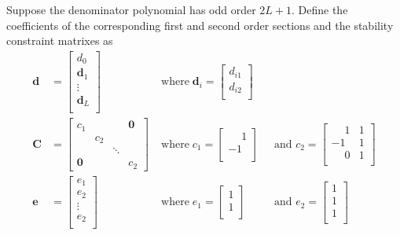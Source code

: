 \documentclass[a4paper,twoside,10pt,english]{report}
\begin{document}
Suppose the denominator polynomial has odd order $2L+1$. Define the
coefficients of the corresponding first and second order sections and the
stability constraint matrixes as
\begin{align*}
\boldsymbol{d}&=\left[\begin{array}{c}
d_{0} \\
\boldsymbol{d}_{1} \\
\vdots \\
\boldsymbol{d}_{L} \\
\end{array}\right]
\; &\text{where}\; \boldsymbol{d}_{i}=\left[\begin{array}{c}
d_{i1} \\
d_{i2} \\
\end{array}\right]\\
\boldsymbol{C}&=\left[\begin{array}{cccc}
c_{1} &       & & \boldsymbol{0} \\
      & c_{2} &               &  \\
      &      & \ddots        & \\
\boldsymbol{0} & & & c_{2}\end{array}\right]
\; &\text{where}\; c_{1}=\left[\begin{array}{c}
\phantom{-}1\\
-1\\
\end{array}\right] \; &\text{ and } c_{2}=\left[\begin{array}{cc}
\phantom{-}1 & 1\\
-1 & 1\\
\phantom{-}0 & 1\\
\end{array}\right]\\
\boldsymbol{e}&=\left[\begin{array}{c}
e_{1}\\
e_{2}\\
\vdots\\
e_{2}\\
\end{array}\right]
\; &\text{where}\; e_{1}=\left[\begin{array}{c}
1\\
1\\
\end{array}\right] \; &\text{ and } e_{2}=\left[\begin{array}{c}
1\\
1\\
1\\
\end{array}\right]
\end{align*}
\end{document}
